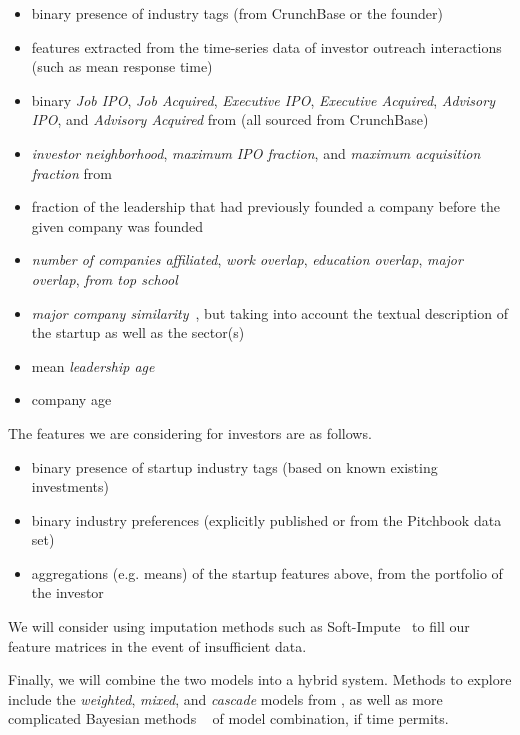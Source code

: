 \begin{itemize}
  \item binary presence of industry tags (from CrunchBase or the founder)
  \item features extracted from the time-series data of investor outreach interactions (such as mean response time)
  \item binary \textit{Job IPO}, \textit{Job Acquired}, \textit{Executive IPO}, \textit{Executive Acquired}, \textit{Advisory IPO}, and \textit{Advisory Acquired} from \cite{2017arXiv170604229H} (all sourced from CrunchBase)
  \item \textit{investor neighborhood}, \textit{maximum IPO fraction}, and \textit{maximum acquisition fraction} from \cite{2017arXiv170604229H}
  \item fraction of the leadership that had previously founded a company before the given company was founded~\cite{2017arXiv170604229H}
  \item \textit{number of companies affiliated}, \textit{work overlap}, \textit{education overlap}, \textit{major overlap}, \textit{from top school}~\cite{2017arXiv170604229H}
  \item \textit{major company similarity}~\cite{2017arXiv170604229H}, but taking into account the textual description of the startup as well as the sector(s)
  \item mean \textit{leadership age}~\cite{2017arXiv170604229H}
  \item company age
\end{itemize}

The features we are considering for investors are as follows.

\begin{itemize}
  \item binary presence of startup industry tags (based on known existing investments)
  \item binary industry preferences (explicitly published or from the Pitchbook data set)
  \item aggregations (e.g. means) of the startup features above, from the portfolio of the investor
\end{itemize}

We will consider using imputation methods such as Soft-Impute~\cite{mazumder2010spectral} to fill our feature matrices in the event of insufficient data.

Finally, we will combine the two models into a hybrid system. Methods to explore include the \textit{weighted}, \textit{mixed}, and \textit{cascade} models from \cite{Burke2002}, as well as more complicated Bayesian methods ~\cite{DECAMPOS2010785} of model combination, if time permits.
